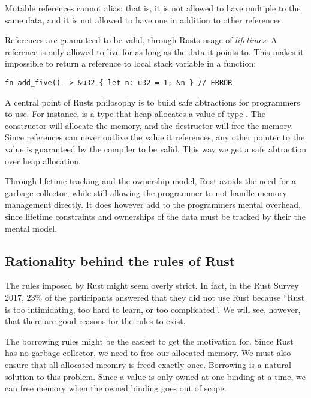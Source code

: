 \documentclass[b5paper,twoside]{report}
\begin{document}
Mutable references cannot alias; that is, it is not allowed to have multiple 
to the same data, and it is not allowed to have one  in addition to other
references.

References are guaranteed to be valid, through Rusts usage of \emph{lifetimes}.
A reference is only allowed to live for as long as the data it points to.
This makes it impossible to return a reference to local stack variable in a function:
\begin{lstlisting}[firstnumber=last]
fn add_five() -> &u32 { let n: u32 = 1; &n } // ERROR
\end{lstlisting}

A central point of Rusts philosophy is to build safe abtractions for programmers to use.
For instance,  is a type that heap allocates a value of type .
The constructor will allocate the memory, and the destructor will free the memory.
Since references can never outlive the value it references, any other pointer to the value
is guaranteed by the compiler to be valid.
This way we get a safe abtraction over heap allocation.

Through lifetime tracking and the ownership model, Rust avoids the need for a
garbage collector, while still allowing the programmer to not handle memory
management directly. It does however add to the programmers mental overhead,
since lifetime constraints and ownerships of the data must be tracked by their
the mental model.



\subsection{Rationality behind the rules of Rust}
The rules imposed by Rust might seem overly strict.
In fact, in the Rust Survey 2017, $23\%$ of the participants answered
that they did not use Rust because ``Rust is too intimidating,
too hard to learn, or too complicated''\cite{rustsurvey2017}.
We will see, however, that there are good reasons for the rules to exist.

The borrowing rules might be the easiest to get the motivation for.
Since Rust has no garbage collector, we need to free our allocated memory.
We must also ensure that all allocated meomry is freed exactly once.
Borrowing is a natural solution to this problem. Since a value is only
owned at one binding at a time, we can free memory when the owned binding
goes out of scope.
\end{document}
